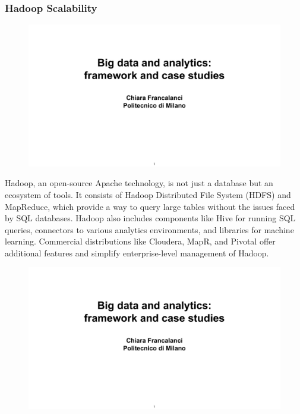 \subsubsection{Hadoop Scalability}

\begin{figure}[!h]
  \centering
  \includegraphics[page=48, trim = 1.5cm 7cm 1.5cm 5cm, clip, width=\imagewidth]{images/06 - BIG_DATA.pdf}
\end{figure}

Hadoop, an open-source Apache technology, is not just a database but an
ecosystem of tools. It consists of Hadoop Distributed File System (HDFS)
and MapReduce, which provide a way to query large tables without the
issues faced by SQL databases. Hadoop also includes components like Hive
for running SQL queries, connectors to various analytics environments,
and libraries for machine learning. Commercial distributions like
Cloudera, MapR, and Pivotal offer additional features and simplify
enterprise-level management of Hadoop.

\begin{figure}[!h]
  \centering
  \includegraphics[page=47, trim = 1.5cm 2cm 3cm 5cm, clip, width=\imagewidth]{images/06 - BIG_DATA.pdf}
\end{figure}


